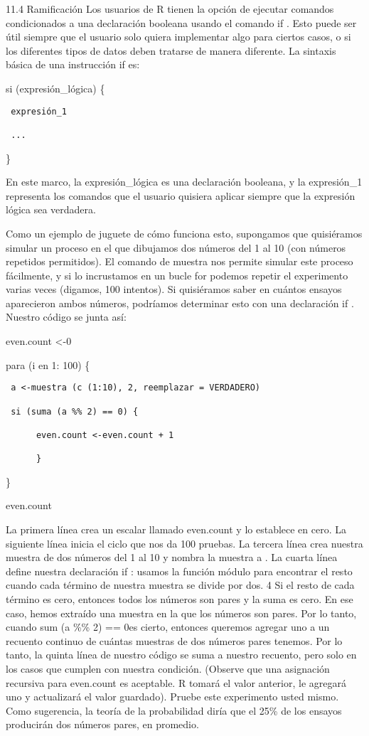 \documentclass[
]{book}
\begin{document}
11.4 Ramificación
Los usuarios de R tienen la opción de ejecutar comandos condicionados a una declaración booleana usando el comando if . Esto puede ser útil siempre que el usuario solo quiera implementar algo para ciertos casos, o si los diferentes tipos de datos deben tratarse de manera diferente. La sintaxis básica de una instrucción if es:

si (expresión\_lógica) \{

\begin{verbatim}
 expresión_1

 ...
\end{verbatim}

\}

En este marco, la expresión\_lógica es una declaración booleana, y la expresión\_1 representa los comandos que el usuario quisiera aplicar siempre que la expresión lógica sea verdadera.

Como un ejemplo de juguete de cómo funciona esto, supongamos que quisiéramos simular un proceso en el que dibujamos dos números del 1 al 10 (con números repetidos permitidos). El comando de muestra nos permite simular este proceso fácilmente, y si lo incrustamos en un bucle for podemos repetir el experimento varias veces (digamos, 100 intentos). Si quisiéramos saber en cuántos ensayos aparecieron ambos números, podríamos determinar esto con una declaración if . Nuestro código se junta así:

even.count \textless-0

para (i en 1: 100) \{

\begin{verbatim}
 a <-muestra (c (1:10), 2, reemplazar = VERDADERO)

 si (suma (a %% 2) == 0) {

      even.count <-even.count + 1

      }
\end{verbatim}

\}

even.count

La primera línea crea un escalar llamado even.count y lo establece en cero. La siguiente línea inicia el ciclo que nos da 100 pruebas. La tercera línea crea nuestra muestra de dos números del 1 al 10 y nombra la muestra a . La cuarta línea define nuestra declaración if : usamos la función módulo para encontrar el resto cuando cada término de nuestra muestra se divide por dos. 4 Si el resto de cada término es cero, entonces todos los números son pares y la suma es cero. En ese caso, hemos extraído una muestra en la que los números son pares. Por lo tanto, cuando sum (a \%\% 2) == 0es cierto, entonces queremos agregar uno a un recuento continuo de cuántas muestras de dos números pares tenemos. Por lo tanto, la quinta línea de nuestro código se suma a nuestro recuento, pero solo en los casos que cumplen con nuestra condición. (Observe que una asignación recursiva para even.count es aceptable. R tomará el valor anterior, le agregará uno y actualizará el valor guardado). Pruebe este experimento usted mismo. Como sugerencia, la teoría de la probabilidad diría que el 25\% de los ensayos producirán dos números pares, en promedio.
\end{document}
